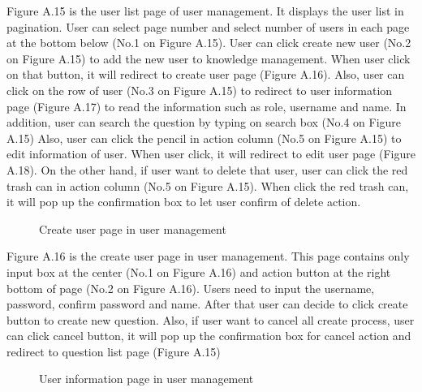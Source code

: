 \documentclass[12pt,oneside,openright,a4paper]{cpe-english-project}
\begin{document}
Figure A.15 is the user list page of user management. It displays the user list in 
pagination. User can select page number and select number of users in each page at the 
bottom below (No.1 on Figure A.15).
User can click create new user (No.2 on Figure A.15) to add the new user to 
knowledge management. When user click on that button, it will redirect to create user page 
(Figure A.16). Also, user can click on the row of user (No.3 on Figure A.15) to redirect to 
user information page (Figure A.17) to read the information such as role, username and 
name. In addition, user can search the question by typing on search box (No.4 on Figure 
A.15)
Also, user can click the pencil in action column (No.5 on Figure A.15) to edit 
information of user. When user click, it will redirect to edit user page (Figure A.18). On the 
other hand, if user want to delete that user, user can click the red trash can in action column 
(No.5 on Figure A.15). When click the red trash can, it will pop up the confirmation box to 
let user confirm of delete action.

\begin{figure}[!h]\centering
{}
\caption{Create user page in user management}
\label{fig:Create user page in user management}
\end{figure}

Figure A.16 is the create user page in user management. This page contains only 
input box at the center (No.1 on Figure A.16) and action button at the right bottom of page 
(No.2 on Figure A.16).
Users need to input the username, password, confirm password and name. After that 
user can decide to click create button to create new question. Also, if user want to cancel all 
create process, user can click cancel button, it will pop up the confirmation box for cancel 
action and redirect to question list page (Figure A.15)

\begin{figure}[!h]\centering
{}
\caption{User information page in user management}
\label{fig:User information page in user management}
\end{figure}
\end{document}
